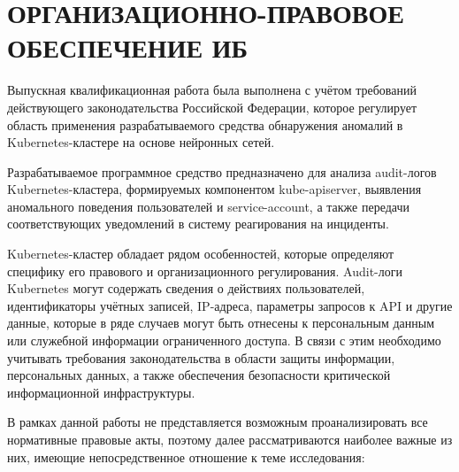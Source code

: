\section{ОРГАНИЗАЦИОННО-ПРАВОВОЕ ОБЕСПЕЧЕНИЕ ИБ}

Выпускная квалификационная работа была выполнена с учётом требований действующего законодательства Российской Федерации, которое регулирует область применения разрабатываемого средства обнаружения аномалий в Kubernetes-кластере на основе нейронных сетей.

Разрабатываемое программное средство предназначено для анализа audit-логов Kubernetes-кластера, формируемых компонентом kube-apiserver, выявления аномального поведения пользователей и service-account, а также передачи соответствующих уведомлений в систему реагирования на инциденты.

Kubernetes-кластер обладает рядом особенностей, которые определяют специфику его правового и организационного регулирования. Audit-логи Kubernetes могут содержать сведения о действиях пользователей, идентификаторы учётных записей, IP-адреса, параметры запросов к API и другие данные, которые в ряде случаев могут быть отнесены к персональным данным или служебной информации ограниченного доступа. В связи с этим необходимо учитывать требования законодательства в области защиты информации, персональных данных, а также обеспечения безопасности критической информационной инфраструктуры.

В рамках данной работы не представляется возможным проанализировать все нормативные правовые акты, поэтому далее рассматриваются наиболее важные из них, имеющие непосредственное отношение к теме исследования:

